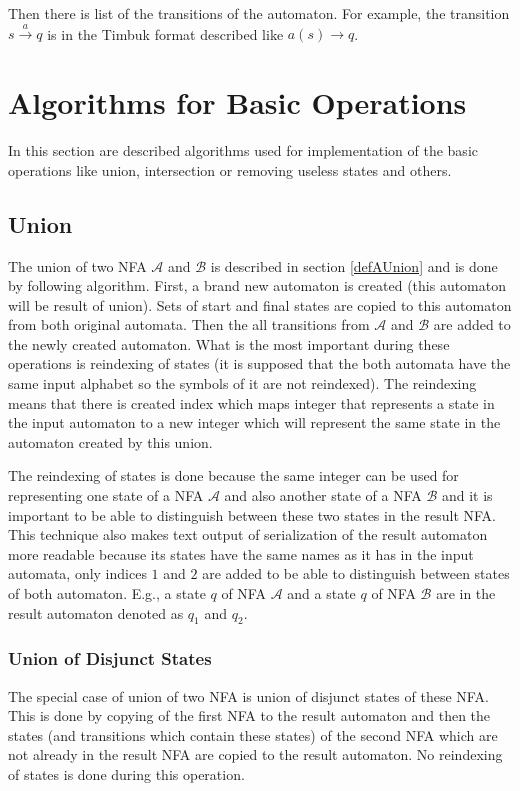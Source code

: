 Then there is list of the transitions of the automaton. 
For example, the transition $s \xrightarrow{a} q$ is in the Timbuk format described like $a(s)\rightarrow q$.

\section{Algorithms for Basic Operations}
In this section are described algorithms used for implementation of the basic operations like union, intersection or removing useless states and others. 

\subsection{Union}
The union of two NFA $\mathcal{A}$ and $\mathcal{B}$ is described in section \ref{defAUnion} and
is done by following algorithm. First, a brand new automaton is created (this automaton
will be result of union). Sets of start and final states are copied to this automaton from both original automata. Then the all transitions from $\mathcal{A}$ and
$\mathcal{B}$ are added to the newly created automaton. What is the most important during these operations is reindexing of states (it is supposed
that the both automata have the same input alphabet so the symbols of it are not reindexed). The reindexing means that there is created index which maps
integer that represents a state in the input automaton to a new integer which will represent the same state in the automaton created by this union.

The reindexing of states is done because the same integer can be used for representing one state of a NFA $\mathcal{A}$ 
and also another state of a NFA $\mathcal{B}$ and it is important
to be able to distinguish between these two states in the result NFA. This technique also makes text output of serialization of the result automaton 
more readable because its states have the same names as it has in the input automata, only indices $1$ and $2$ are added to be able to 
distinguish between states of both automaton. E.g., a state $q$ of NFA $\mathcal{A}$ and a state $q$ of NFA $\mathcal{B}$ are in the result automaton denoted
as $q_1$ and $q_2$.

\subsubsection{Union of Disjunct States}
The special case of union of two NFA is union of disjunct states of these NFA. This is done by copying of the first NFA to the result automaton and then
the states (and transitions which contain these states) of the second NFA which are not already in the result NFA are copied to the result automaton.
No reindexing of states is done during this operation.

